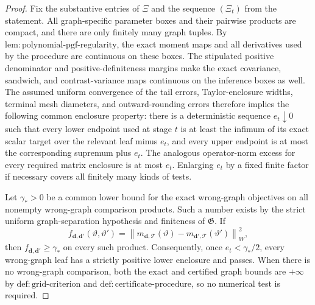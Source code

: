 \documentclass{article}
\begin{document}
\begin{proof}
Fix the substantive entries of \(\Xi\) and the sequence \((\Xi_t)\) from the statement.  All graph-specific parameter boxes and their pairwise products are compact, and there are only finitely many graph tuples.  By \(\mathrm{lem{:}polynomial\text{-}pgf\text{-}regularity}\), the exact moment maps and all derivatives used by the procedure are continuous on these boxes.  The stipulated positive denominator and positive-definiteness margins make the exact covariance, sandwich, and contrast-variance maps continuous on the inference boxes as well.  The assumed uniform convergence of the tail errors, Taylor-enclosure widths, terminal mesh diameters, and outward-rounding errors therefore implies the following common enclosure property: there is a deterministic sequence \(e_t\downarrow0\) such that every lower endpoint used at stage \(t\) is at least the infimum of its exact scalar target over the relevant leaf minus \(e_t\), and every upper endpoint is at most the corresponding supremum plus \(e_t\).  The analogous operator-norm excess for every required matrix enclosure is at most \(e_t\).  Enlarging \(e_t\) by a fixed finite factor if necessary covers all finitely many kinds of tests.

Let \(\gamma_*>0\) be a common lower bound for the exact wrong-graph objectives on all nonempty wrong-graph comparison products.  Such a number exists by the strict uniform graph-separation hypothesis and finiteness of \(\mathfrak G\).  If
\[
 f_{\boldsymbol d,\boldsymbol d'}(\vartheta,\vartheta')
 =\left\lVert m_{\boldsymbol d,\mathcal T}(\vartheta)
        -m_{\boldsymbol d',\mathcal T}(\vartheta')\right\rVert_W^2,
\]
then \(f_{\boldsymbol d,\boldsymbol d'}\geq\gamma_*\) on every such product.  Consequently, once \(e_t<\gamma_*/2\), every wrong-graph leaf has a strictly positive lower enclosure and passes.  When there is no wrong-graph comparison, both the exact and certified graph bounds are \(+\infty\) by \(\mathrm{def{:}grid\text{-}criterion}\) and \(\mathrm{def{:}certificate\text{-}procedure}\), so no numerical test is required.


\end{proof}
\end{document}
